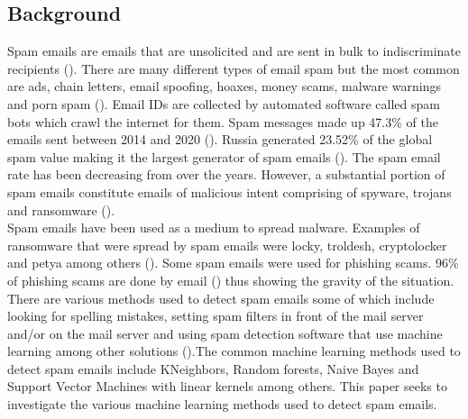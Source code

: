 \subsection{Background}
Spam emails are emails that are unsolicited and are sent in bulk to indiscriminate recipients (\cite{comodo_2021}). There are many different types of email spam but the most common are ads, chain letters, email spoofing, hoaxes, money scams, malware warnings and porn spam (\cite{gatefy_2021}). Email IDs are collected by automated software called spam bots which crawl the internet for them. Spam messages made up 47.3\% of the emails sent between 2014 and 2020 (\cite{johnson_2021}). Russia generated 23.52\%  of the global spam value making it the largest generator of spam emails (\cite{johnson_2021}). The spam email rate has been decreasing from over the years. However, a substantial portion of spam emails constitute emails of malicious intent comprising of spyware, trojans and ransomware (\cite{johnson_2021}).\\
Spam emails have been used as a medium to spread malware. Examples of ransomware that were spread by spam emails were locky, troldesh, cryptolocker and petya among others (\cite{kaspersky_2021}). Some spam emails were used for phishing scams. 96\% of phishing scams are done by email (\cite{verizon}) thus showing the gravity of the situation.
\\
There are various methods used to detect spam emails some of which include looking for spelling mistakes, setting spam filters in front of the mail server and/or on the mail server and using spam detection software that use machine learning among other solutions (\cite{wikipedia_2021_email}).The common machine learning methods used to detect spam emails include KNeighbors, Random forests, Naive Bayes and Support Vector Machines with linear kernels among others. This paper seeks to investigate the various machine learning methods used to detect spam emails.